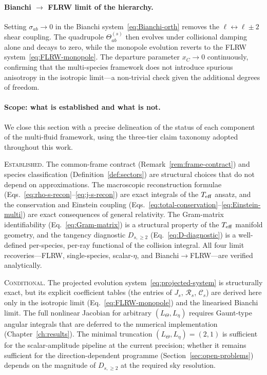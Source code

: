 \paragraph{Bianchi $\to$ FLRW limit of the hierarchy.}

Setting $\sigma_{ab} \to 0$ in the Bianchi
system~\eqref{eq:Bianchi-orth} removes the
$\ell \leftrightarrow \ell \pm 2$ shear coupling.
The quadrupole $\Theta^{(s)}_{ab}$ then evolves
under collisional damping alone and decays to zero,
while the monopole evolution reverts to the FLRW
system~\eqref{eq:FLRW-monopole}.  The departure
parameter $x_C \to 0$ continuously, confirming that
the multi-species framework does not introduce
spurious anisotropy in the isotropic limit---a
non-trivial check given the additional degrees of
freedom.


\paragraph{Scope: what is established and what is not.}

We close this section with a precise delineation of
the status of each component of the multi-fluid
framework, using the three-tier claim taxonomy
adopted throughout this work.

\medskip\noindent\textsc{Established.}\enspace
The common-frame contract
(Remark~\ref{rem:frame-contract}) and species
classification (Definition~\ref{def:sectors}) are
structural choices that do not depend on
approximations.
The macroscopic reconstruction formulae
(Eqs.~\ref{eq:rho-s-recon}--\ref{eq:j-s-recon})
are exact integrals of the $T_{\mathrm{eff}}$ ansatz, and the
conservation and Einstein coupling
(Eqs.~\ref{eq:total-conservation}--\ref{eq:Einstein-multi})
are exact consequences of general relativity.
The Gram-matrix identifiability
(Eq.~\ref{eq:Gram-matrix}) is a structural property
of the $T_{\mathrm{eff}}$ manifold geometry, and the tangency
diagnostic $D_{s,\geq 2}$
(Eq.~\ref{eq:D-diagnostic}) is a well-defined
per-species, per-ray functional of the collision
integral.
All four limit recoveries---FLRW, single-species,
scalar-$\eta$, and Bianchi$\to$FLRW---are verified
analytically.

\medskip\noindent\textsc{Conditional.}\enspace
The projected evolution
system~\eqref{eq:projected-system} is structurally
exact, but its explicit coefficient tables
(the entries of $J_s$, $\mathcal{R}_s$,
$\mathcal{C}_s$) are derived here only in the
isotropic limit (Eq.~\ref{eq:FLRW-monopole}) and
the linearised Bianchi limit.  The full nonlinear
Jacobian for arbitrary $(L_\Theta, L_\eta)$ requires
Gaunt-type angular integrals that are deferred to the
numerical implementation
(Chapter~\ref{ch:results}).
The minimal truncation
$(L_\Theta, L_\eta) = (2, 1)$ is sufficient for
the scalar-amplitude pipeline at the current
precision; whether it remains sufficient for the
direction-dependent programme
(Section~\ref{sec:open-problems}) depends on the
magnitude of $D_{s,\geq 2}$ at the required
sky resolution.

